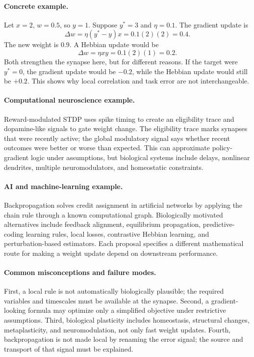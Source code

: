 \paragraph{Concrete example.}
Let \(x=2\), \(w=0.5\), so \(y=1\). Suppose \(y^*=3\) and \(\eta=0.1\). The gradient update is
\[
\Delta w=\eta(y^*-y)x=0.1(2)(2)=0.4.
\]
The new weight is \(0.9\). A Hebbian update would be
\[
\Delta w=\eta xy=0.1(2)(1)=0.2.
\]
Both strengthen the synapse here, but for different reasons. If the target were \(y^*=0\), the gradient update would be \(-0.2\), while the Hebbian update would still be \(+0.2\). This shows why local correlation and task error are not interchangeable.

\paragraph{Computational neuroscience example.}
Reward-modulated STDP uses spike timing to create an eligibility trace and dopamine-like signals to gate weight change. The eligibility trace marks synapses that were recently active; the global modulatory signal says whether recent outcomes were better or worse than expected. This can approximate policy-gradient logic under assumptions, but biological systems include delays, nonlinear dendrites, multiple neuromodulators, and homeostatic constraints.

\paragraph{AI and machine-learning example.}
Backpropagation solves credit assignment in artificial networks by applying the chain rule through a known computational graph. Biologically motivated alternatives include feedback alignment, equilibrium propagation, predictive-coding learning rules, local losses, contrastive Hebbian learning, and perturbation-based estimators. Each proposal specifies a different mathematical route for making a weight update depend on downstream performance.

\paragraph{Common misconceptions and failure modes.}
First, a local rule is not automatically biologically plausible; the required variables and timescales must be available at the synapse. Second, a gradient-looking formula may optimize only a simplified objective under restrictive assumptions. Third, biological plasticity includes homeostasis, structural changes, metaplasticity, and neuromodulation, not only fast weight updates. Fourth, backpropagation is not made local by renaming the error signal; the source and transport of that signal must be explained.

